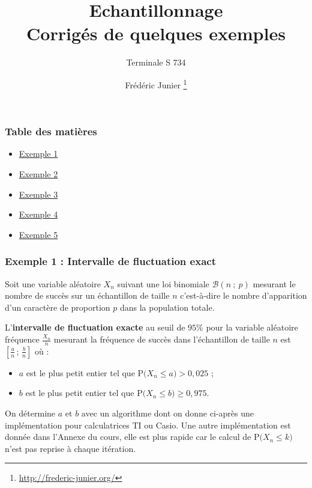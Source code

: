 \documentclass[xcolor=svgnames,t,final]{beamer}
\title{Echantillonnage \\ Corrigés de quelques exemples}\subtitle{Terminale S 734}
\author[]{Frédéric Junier \thanks{\url{http://frederic-junier.org/} }}
\institute[Lycée du Parc]{Lycée du Parc, Lyon}
\date[]{}
\newcommand{\Interff}[2]{\left[#1\, ;\, #2\right]}
\newcommand{\loibinom}[2]{\mathcal{B}\left(#1\ ; \ #2 \right)}
\newcommand{\proba}[1]{\text{P}\big(#1\big)}
\newcommand{\ie}{c'est-à-dire}
\begin{document}
\frame{\titlepage}



\begin{frame}
\frametitle{Table des matières}
\begin{itemize}
	\item \hyperlink{exemple1}{Exemple 1}
	\item \hyperlink{exemple2}{Exemple 2}
	\item \hyperlink{exemple3}{Exemple 3}
	\item \hyperlink{exemple4}{Exemple 4}
	\item \hyperlink{exemple5}{Exemple 5}
\end{itemize}

\end{frame}
 

\begin{frame}

\label{exemple1}

\frametitle{Exemple 1 : Intervalle de fluctuation exact}


Soit une  variable aléatoire $X_{n}$ suivant une  loi binomiale $\loibinom{n}{p}$ mesurant le nombre de succès sur un échantillon de taille $n$ \ie{} le nombre d'apparition  d'un caractère de proportion $p$ dans la population totale.


L'\textbf{intervalle de fluctuation exacte} au seuil de $95 \%$ pour la variable aléatoire fréquence $\frac{X_{n}}{n}$ mesurant la fréquence de succès dans l'échantillon de taille $n$ est $\Interff{\frac{a}{n}}{\frac{b}{n}}$ où : 

\begin{itemize}

\item $a$ est  le plus petit entier tel que $\proba{X_{n} \leqslant a} > 0,025$ ;

\item $b$  est  le plus petit entier tel que $\proba{X_{n} \leqslant b} \geqslant  0,975$.

\end{itemize}



On  détermine $a$ et $b$ avec un algorithme dont on donne ci-après une implémentation pour calculatrices TI ou Casio. Une autre implémentation est donnée dans l'Annexe du cours, elle est plus rapide car le calcul de $\proba{X_{n} \leqslant k}$ n'est pas reprise à chaque itération.

\end{frame}
\end{document}
